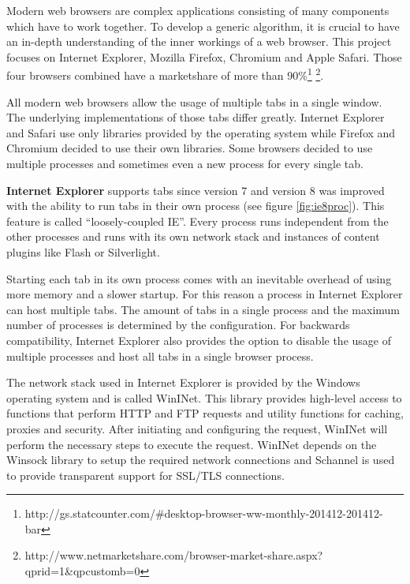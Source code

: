 
Modern web browsers are complex applications consisting of many components which have to work together. To develop a generic algorithm, it is crucial to have an in-depth understanding of the inner workings of a web browser. This project focuses on Internet Explorer, Mozilla Firefox, Chromium and Apple Safari. Those four browsers combined have a marketshare of more than 90\%\footnote{http://gs.statcounter.com/\#desktop-browser-ww-monthly-201412-201412-bar} \footnote{http://www.netmarketshare.com/browser-market-share.aspx?qprid=1\&qpcustomb=0}.

All modern web browsers allow the usage of multiple tabs in a single window. The underlying implementations of those tabs differ greatly. Internet Explorer and Safari use only libraries provided by the operating system while Firefox and Chromium decided to use their own libraries. Some browsers decided to use multiple processes and sometimes even a new process for every single tab.

\textbf{Internet Explorer} supports tabs since version 7 and version 8 was improved with the ability to run tabs in their own process (see figure \ref{fig:ie8proc}). This feature is called ``loosely-coupled IE''\cite{IE8LCIE}. Every process runs independent from the other processes and runs with its own network stack and instances of content plugins like Flash or Silverlight.

Starting each tab in its own process comes with an inevitable overhead of using more memory and a slower startup. For this reason a process in Internet Explorer can host multiple tabs. The amount of tabs in a single process and the maximum number of processes is determined by the configuration. For backwards compatibility, Internet Explorer also provides the option to disable the usage of multiple processes and host all tabs in a single browser process.

\label{sec:brie}
The network stack used in Internet Explorer is provided by the Windows operating system and is called WinINet\cite{wininet}. This library provides high-level access to functions that perform HTTP and FTP requests and utility functions for caching, proxies and security. After initiating and configuring the request, WinINet will perform the necessary steps to execute the request. WinINet depends on the Winsock library \cite{winsock} to setup the required network connections and Schannel \cite{schannel} is used to provide transparent support for SSL/TLS connections.

